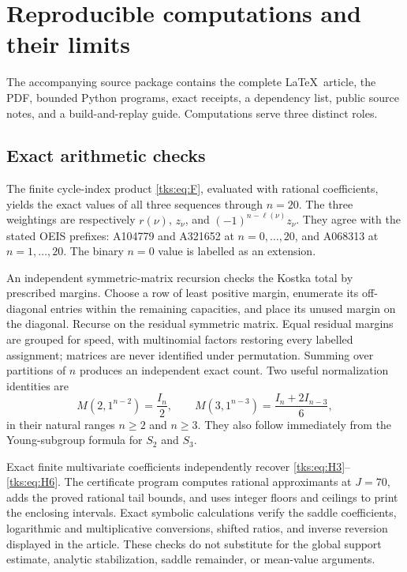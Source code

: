 \section{Reproducible computations and their limits}\label{tks:sec:computation}
The accompanying source package contains the complete \LaTeX\ article, the PDF, bounded Python programs, exact receipts, a dependency list, public source notes, and a build-and-replay guide. Computations serve three distinct roles.

\subsection{Exact arithmetic checks}
The finite cycle-index product \eqref{tks:eq:F}, evaluated with rational coefficients, yields the exact values of all three sequences through $n=20$. The three weightings are respectively $r(\nu)$, $z_\nu$, and $(-1)^{n-\ell(\nu)}z_\nu$. They agree with the stated OEIS prefixes: A104779 and A321652 at $n=0,\ldots,20$, and A068313 at $n=1,\ldots,20$. The binary $n=0$ value is labelled as an extension.

An independent symmetric-matrix recursion checks the Kostka total by prescribed margins. Choose a row of least positive margin, enumerate its off-diagonal entries within the remaining capacities, and place its unused margin on the diagonal. Recurse on the residual symmetric matrix. Equal residual margins are grouped for speed, with multinomial factors restoring every labelled assignment; matrices are never identified under permutation. Summing over partitions of $n$ produces an independent exact count. Two useful normalization identities are
\begin{equation}\label{tks:eq:fixedmarginchecks}
M(2,1^{n-2})=\frac{I_n}{2},\qquad
M(3,1^{n-3})=\frac{I_n+2I_{n-3}}6,
\end{equation}
in their natural ranges $n\geq2$ and $n\geq3$. They also follow immediately from the Young-subgroup formula for $S_2$ and $S_3$.

Exact finite multivariate coefficients independently recover \eqref{tks:eq:H3}--\eqref{tks:eq:H6}. The certificate program computes rational approximants at $J=70$, adds the proved rational tail bounds, and uses integer floors and ceilings to print the enclosing intervals. Exact symbolic calculations verify the saddle coefficients, logarithmic and multiplicative conversions, shifted ratios, and inverse reversion displayed in the article. These checks do not substitute for the global support estimate, analytic stabilization, saddle remainder, or mean-value arguments.

